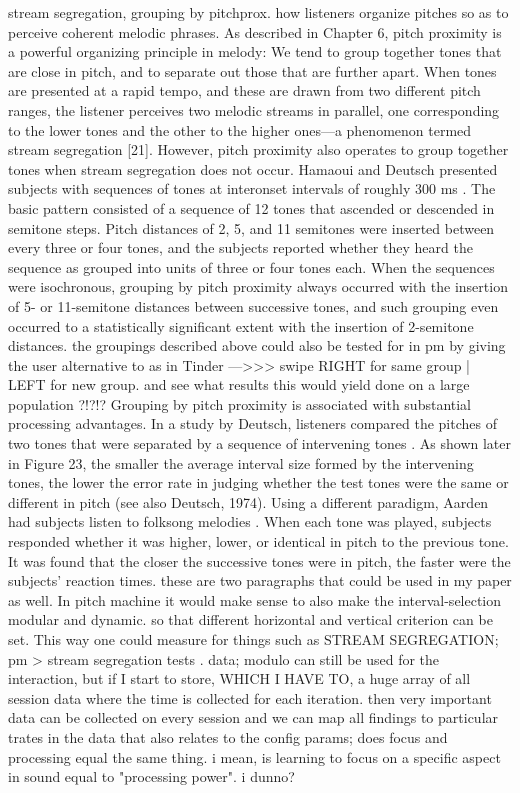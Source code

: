 stream segregation, grouping by pitchprox. how listeners organize pitches so as to perceive coherent melodic phrases. As described in Chapter 6, pitch proximity is a powerful organizing principle in melody: We tend to group together tones that are close in pitch, and to separate out those that are further apart. When tones are presented at a rapid tempo, and these are drawn from two different pitch ranges, the listener perceives two melodic streams in parallel, one corresponding to the lower tones and the other to the higher ones—a phenomenon termed stream segregation [21]. However, pitch proximity also operates to group together tones when stream segregation does not occur. Hamaoui and Deutsch  presented subjects with sequences of tones at interonset intervals of roughly 300 ms \cite{hamaoui2006perceptual}. The basic pattern consisted of a sequence of 12 tones that ascended or descended in semitone steps. Pitch distances of 2, 5, and 11 semitones were inserted between every three or four tones, and the subjects reported whether they heard the sequence as grouped into units of three or four tones each. When the sequences were isochronous, grouping by pitch proximity always occurred with the insertion of 5- or 11-semitone distances between successive tones, and such grouping even occurred to a statistically significant extent with the insertion of 2-semitone distances. the groupings described above could also be tested for in pm by giving the user alternative to as in Tinder —>>> swipe RIGHT for same group | LEFT for new group. and see what results this would yield done on a large population ?!?!? Grouping by pitch proximity is associated with substantial processing advantages. In a study by Deutsch, listeners compared the pitches of two tones that were separated by a sequence of intervening tones \cite{deutsch1978delayed}. As shown later in Figure 23, the smaller the average interval size formed by the intervening tones, the lower the error rate in judging whether the test tones were the same or different in pitch (see also Deutsch, 1974). Using a different paradigm, Aarden had subjects listen to folksong melodies \cite{aarden2003dynamic}. When each tone was played, subjects responded whether it was higher, lower, or identical in pitch to the previous tone. It was found that the closer the successive tones were in pitch, the faster were the subjects’ reaction times. these are two paragraphs that could be used in my paper as well. In pitch machine it would make sense to also make the interval-selection modular and dynamic. so that different horizontal and vertical criterion can be set. This way one could measure for things such as STREAM SEGREGATION; pm > stream segregation tests . data; modulo can still be used for the interaction, but if I start to store, WHICH I HAVE TO, a huge array of all session data where the time is collected for each iteration. then very important data can be collected on every session and we can map all findings to particular trates in the data that also relates to the config params; does focus and processing equal the same thing. i mean, is learning to focus on a specific aspect in sound equal to "processing power". i dunno?

